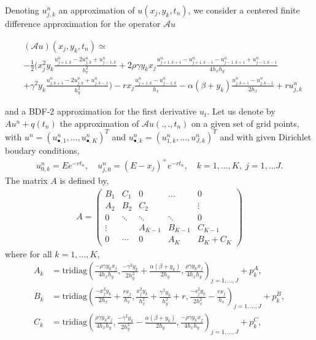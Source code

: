 \documentclass[12pt,a4paper]{article}
\begin{document}
Denoting $u_{j,k}^n$ an approximation of $u(x_j,y_k,t_n)$, we consider a centered finite difference approximation for the operator $\mathcal{A}u$ 
\begin{footnotesize}
\begin{align*}
	&(\mathcal{A}u)(x_j,y_k,t_n) \simeq \\
	&-\frac{1}{2} \bigg( x_j^2 y_k \frac{u_{j+1,k}^n - 2u_{j,k}^n + u_{j-1,k}^n}{h_x^2} 
	 +2 \rho \gamma y_k x_j \frac{u_{j+1,k+1}^n - u_{j+1,k-1}^n - u_{j-1,k+1}^n + u_{j-1,k-1}^n}{4 h_x h_y} \\ 
	&+ \gamma^2 y_k \frac{u_{j,k+1}^n - 2 u_{j,k}^n + u_{j,k-1}^n}{h_y^2} \bigg) - r x_j \frac{u_{j+1,k}^n-u_{j-1,k}^n}{h_x} - \alpha (\beta + y_k) \frac{u_{j,k+1}^n - u_{j,k-1}^n}{2 h_x} + ru_{j,k}^n
\end{align*}
\end{footnotesize}
and a BDF-2 approximation for the first derivative $u_t$. Let us denote by $A u^n + q(t_n)$ the approximation of $\mathcal{A}u(.,.,t_n)$ on a given set of grid points, with $u^n = (u_{\bullet,1}^n,\dots,u_{\bullet,K}^n)^T$ and $u_{\bullet,k}^n = (u_{1,k}^n,\dots,u_{J,k}^n)^T$ and with given Dirichlet boudary conditions,
\begin{align*}
u_{0,k}^n = E e^{-r t_n}, \quad u_{j,0}^n = (E-x_j)^+ e^{-r t_n}, \quad k=1,\dots,K, \; j=1,\dots J.
\end{align*}
The matrix $A$ is defined by,
\begin{align*}
A = \begin{pmatrix}
   B_1 & C_1 & 0 & \hdots & 0 \\
   A_2 & B_2 & C_2 & & \vdots \\
   0 & \ddots & \ddots & \ddots & 0 \\
   \vdots & & A_{K-1} & B _{K-1} & C_{K-1} \\
   0 & \cdots & 0 & A_K & B_K + C_K
\end{pmatrix}
\end{align*}
where for all $k = 1, \dots, K$,
\begin{align*}
	A_k	&= \text{tridiag} \left( \frac{-\rho \gamma y_k x_j}{4 h_x h_y}, \frac{-\gamma^2 y_k}{2 h_y^2} + \frac{\alpha (\beta + y_k)}{2 h_y}, \frac{\rho \gamma y_k x_j}{4 h_x h_y} \right)_{j=1,\dots,J} + p^A_k, \\
	B_k &= \text{tridiag} \left( \frac{-x_j^2 y_k}{2h_x} + \frac{r x_j}{h_x}, \frac{x_j^2 y_k}{h_x^2} + \frac{\gamma^2 y_k}{h_y^2} + r, \frac{-s_j^2 y_k}{2 h_x^2} - \frac{r x_j}{h_x} \right)_{j=1,\dots,J} + p^B_k, \\
	C_k &= \text{tridiag} \left( \frac{\rho \gamma y_k x_j}{4 h_x h_y}, \frac{-\gamma^2 y_k}{2 h_y^2} - \frac{\alpha (\beta + y_k)}{2 h_y}, \frac{-\rho \gamma y_k x_j}{4 h_x h_y} \right)_{j=1,\dots,J} + p^C_k,
\end{align*}
\end{document}
